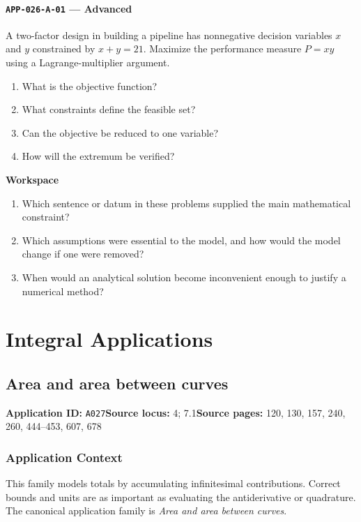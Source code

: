 \documentclass[11pt]{book}
\newcommand{\pid}[1]{\texttt{#1}}
\newcommand{\workspace}{\par\vspace{0.7in}\hrulefill\par\vspace{0.55in}\hrulefill\par}
\begin{document}
\subsection*{\pid{APP-026-A-01} — Advanced}
\begin{problembox}
A two-factor design in building a pipeline has nonnegative decision variables $x$ and $y$ constrained by $x+y=21$. Maximize the performance measure $P=xy$ using a Lagrange-multiplier argument.
\end{problembox}
\begin{promptbox}\begin{enumerate}
\item What is the objective function?
\item What constraints define the feasible set?
\item Can the objective be reduced to one variable?
\item How will the extremum be verified?
\end{enumerate}\end{promptbox}
\textbf{Workspace}\workspace
\begin{reflectionbox}\begin{enumerate}
\item Which sentence or datum in these problems supplied the main mathematical constraint?
\item Which assumptions were essential to the model, and how would the model change if one were removed?
\item When would an analytical solution become inconvenient enough to justify a numerical method?
\end{enumerate}\end{reflectionbox}
\part{Integral Applications}
\chapter{Area and area between curves}\label{app:A027}
\textbf{Application ID:} \pid{A027}\quad \textbf{Source locus:} 4; 7.1\quad \textbf{Source pages:} 120, 130, 157, 240, 260, 444–453, 607, 678
\section*{Application Context}
This family models totals by accumulating infinitesimal contributions. Correct bounds and units are as important as evaluating the antiderivative or quadrature. The canonical application family is \emph{Area and area between curves}.
\end{document}
